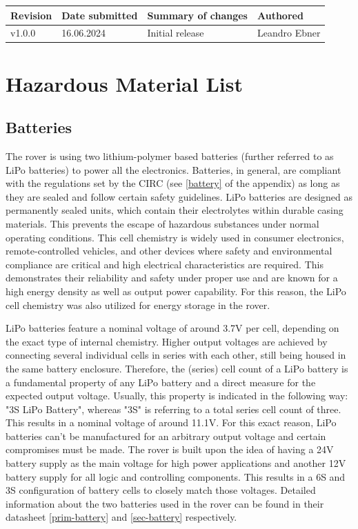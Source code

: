     \begin{table}[b]
        \centering
        \begin{tabular}{|l|l|l|l|} \hline 
             Revision&  Date submitted& Summary of changes  &Authored \\ \hline 
             v1.0.0&  16.06.2024& Initial release  &Leandro Ebner \\ \hline
        \end{tabular}
    \end{table}

    \clearpage
\section{Hazardous Material List}

    \subsection{Batteries}
    
    The rover is using two lithium-polymer based batteries (further referred to as LiPo batteries) to power all the electronics. Batteries, in general, are compliant with the regulations set by the CIRC (see \ref{battery} of the appendix) as long as they are sealed and follow certain safety guidelines. LiPo batteries are designed as permanently sealed units, which contain their electrolytes within durable casing materials. This prevents the escape of hazardous substances under normal operating conditions. This cell chemistry is widely used in consumer electronics, remote-controlled vehicles, and other devices where safety and environmental compliance are critical and high electrical characteristics are required. This demonstrates their reliability and safety under proper use and are known for a high energy density as well as output power capability. For this reason, the LiPo cell chemistry was also utilized for energy storage in the rover.
    
    \vspace{5mm}
    
    LiPo batteries feature a nominal voltage of around 3.7V per cell, depending on the exact type of internal chemistry. Higher output voltages are achieved by connecting several individual cells in series with each other, still being housed in the same battery enclosure. Therefore, the (series) cell count of a LiPo battery is a fundamental property of any LiPo battery and a direct measure for the expected output voltage. Usually, this property is indicated in the following way: "3S LiPo Battery", whereas "3S" is referring to a total series cell count of three. This results in a nominal voltage of around 11.1V. For this exact reason, LiPo batteries can't be manufactured for an arbitrary output voltage and certain compromises must be made. The rover is built upon the idea of having a 24V battery supply as the main voltage for high power applications and another 12V battery supply for all logic and controlling components. This results in a 6S and 3S configuration of battery cells to closely match those voltages. Detailed information about the two batteries used in the rover can be found in their datasheet \ref{prim-battery} and \ref{sec-battery} respectively.

